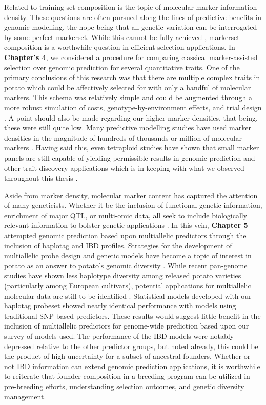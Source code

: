 \documentclass[
]{article}
\begin{document}
Related to training set composition is the topic of molecular marker
information density. These questions are often pursued along the lines
of predictive benefits in genomic modelling, the hope being that all
genetic variation can be interrogated by some perfect markerset. While
this cannot be fully achieved \autocite{Brachi2011}, markerset
composition is a worthwhile question in efficient selection
applications. In \textbf{Chapter's 4}, we considered a procedure for
comparing classical marker-assisted selection over genomic prediction
for several quantitative traits. One of the primary conclusions of this
research was that there are multiple complex traits in potato which
could be affectively selected for with only a handful of molecular
markers. This schema was relatively simple and could be augmented
through a more robust simulation of costs, genotype-by-environment
effects, and trial design \autocite{Peixoto2024}. A point should also be
made regarding our higher marker densities, that being, these were still
quite low. Many predictive modelling studies have used marker densities
in the magnitude of hundreds of thousands or million of molecular
markers \autocite{Druet2014,Weber2024}. Having said this, even
tetraploid studies have shown that small marker panels are still capable
of yielding permissible results in genomic prediction and other trait
discovery applications which is in keeping with what we observed
throughout this thesis \autocite{Aalborg2024,Leyva-Perez2022}.

Aside from marker density, molecular marker content has captured the
attention of many geneticists. Whether it be the inclusion of functional
genetic information, enrichment of major QTL, or multi-omic data, all
seek to include biologically relevant information to bolster genetic
applications \autocite{Guo2016,MacLeod2016,Arouisse2024}. In this vein,
\textbf{Chapter 5} attempted genomic prediction based upon multiallelic
predictors through the inclusion of haplotag and IBD profiles.
Strategies for the development of multiallelic probe design and genetic
models have become a topic of interest in potato as an answer to
potato's genomic diversity \autocite{Tang2022}. While recent pan-genome
studies have shown less haplotype diversity among released potato
varieties (particularly among European cultivars), potential
applications for multiallelic molecular data are still to be identified
\autocite{Sun2025}. Statistical models developed with our haplotag
probeset showed nearly identical performance with models using
traditional SNP-based predictors. These results would suggest little
benefit in the inclusion of multiallelic predictors for genome-wide
prediction based upon our survey of models used. The performance of the
IBD models were notably depressed relative to the other predictor
groups, but noted already, this could be the product of high uncertainty
for a subset of ancestral founders. Whether or not IBD information can
extend genomic prediction applications, it is worthwhile to reiterate
that founder composition in a breeding program can be utilized in
pre-breeding efforts, understanding selection outcomes, and genetic
diversity management.
\end{document}
